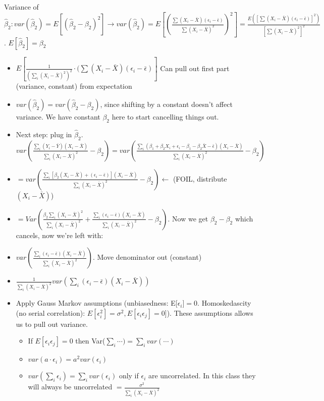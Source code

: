 \documentclass[10pt, oneside]{article}
\begin{document}
Variance of $\hat \beta_2: var(\hat \beta_2) = E[(\hat \beta_2 - \beta_2 )^2] \rightarrow var(\hat \beta_2) = E[(\frac{\sum (X_i - \bar X) (\epsilon_i - \bar \epsilon)}{\sum (X_i - \bar X)^2})^2]=\frac{E([\sum(X_i - \bar X) (\epsilon_i -\bar \epsilon)]^2)}{[\sum(X_i -\bar X)^2]^2}$. $E[\hat \beta_2 ] = \beta_2$
\begin{itemize}
    \item $E[\frac{1}{(\sum_i (X_i -\bar X)^2 )^2} \cdot (\sum(X_i-\bar X)( \epsilon_i -\bar \epsilon)]$ Can pull out first part (variance, constant) from expectation
    \item $var(\hat \beta_2) = var(\hat \beta_2 - \beta_2)$, since shifting by a constant doesn't affect variance. We have constant $\beta_2$ here to start cancelling things out.
    \item Next step: plug in $\hat \beta_2$. $var(\frac{\sum_i (Y_i - \bar Y)(X_i - \bar X)}{\sum_i (X_i -\bar X)^2} - \beta_2)=var(\frac{\sum_i (\beta_1 + \beta_2 X_i + \epsilon_i -\beta_1 -\beta_2 \bar X-\bar \epsilon) (X_i -\bar X)}{\sum_i (X_i -\bar X)^2} - \beta_2)$
    \item $=var(\frac{\sum_i [\beta_2(X_i -\bar X) + (\epsilon_i -\bar \epsilon)] (X_i -\bar X)}{\sum_i (X_i -\bar X)^2} -\beta_2)\leftarrow $ (FOIL, distribute $(X_i -\bar X)$)
    \item $=Var(\frac{\beta_2 \sum_i (X_i-\bar X)^2}{\sum_i (X_i -\bar X)^2} + \frac{\sum_i (\epsilon_i -\bar \epsilon)(X_i -\bar X)}{\sum_i (X_i -\bar X)^2} - \beta_2)$. Now we get $\beta_2 -\beta_2$ which cancels, now we're left with:
    \item $var(\frac{\sum_i (\epsilon_i -\bar \epsilon)(X_i -\bar X)}{\sum_i (X_i -\bar X)^2})$. Move denominator out (constant)
    \item $\frac{1}{\sum_i (X_i -\bar X)^2} var(\sum_i (\epsilon_i -\bar \epsilon)(X_i -\bar X))$
    \item Apply Gauss Markov assumptions (unbiasedness: E[$\epsilon_i] = 0$. Homoskedascity (no serial correlation): $E[\epsilon_i ^2] = \sigma^2, E[\epsilon_i \epsilon_j] = 0$]). These assumptions allows us to pull out variance.
    \begin{itemize}
        \item If $E[\epsilon_i \epsilon_j] = 0$ then Var($\sum_i \cdots) = \sum_i var(\cdots)$
        \item $var(a\cdot \epsilon_i) = a^2 var(\epsilon_i)$
        \item $var(\sum_i \epsilon_i)=\sum_i var(\epsilon_i)$ only if $\epsilon_i$ are uncorrelated. In this class they will always be uncorrelated $=\frac{\sigma^2}{\sum_i (X_i -\bar X)^2}$

\end{itemize}
\end{itemize}
\end{document}

